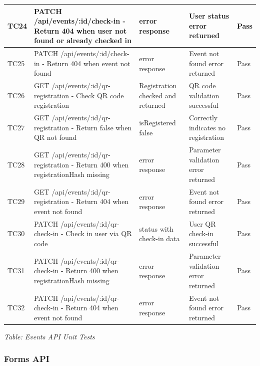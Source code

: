 \documentclass[12pt, titlepage]{article}
\begin{document}
\begin{longtable}{|>{\raggedright\arraybackslash}p{1cm}|>{\raggedright\arraybackslash}p{5cm}|>{\raggedright\arraybackslash}p{3.25cm}|>{\raggedright\arraybackslash}p{3.25cm}|>{\raggedright\arraybackslash}p{1.5cm}|}
\hline
TC24 & PATCH /api/events/:id/check-in - Return 404 when user not found or already checked in & 404 error response & User status error returned & \cellcolor{green!30}Pass \\
\hline
TC25 & PATCH /api/events/:id/check-in - Return 404 when event not found & 404 error response & Event not found error returned & \cellcolor{green!30}Pass \\
\hline
TC26 & GET /api/events/:id/qr-registration - Check QR code registration & Registration checked and returned & QR code validation successful & \cellcolor{green!30}Pass \\
\hline
TC27 & GET /api/events/:id/qr-registration - Return false when QR not found & isRegistered false & Correctly indicates no registration & \cellcolor{green!30}Pass \\
\hline
TC28 & GET /api/events/:id/qr-registration - Return 400 when registrationHash missing & 400 error response & Parameter validation error returned & \cellcolor{green!30}Pass \\
\hline
TC29 & GET /api/events/:id/qr-registration - Return 404 when event not found & 404 error response & Event not found error returned & \cellcolor{green!30}Pass \\
\hline
TC30 & PATCH /api/events/:id/qr-check-in - Check in user via QR code & 200 status with check-in data & User QR check-in successful & \cellcolor{green!30}Pass \\
\hline
TC31 & PATCH /api/events/:id/qr-check-in - Return 400 when registrationHash missing & 400 error response & Parameter validation error returned & \cellcolor{green!30}Pass \\
\hline
TC32 & PATCH /api/events/:id/qr-check-in - Return 404 when event not found & 404 error response & Event not found error returned & \cellcolor{green!30}Pass \\
\hline
\end{longtable}

\vspace{0.5cm}

{\small \textit{Table: Events API Unit Tests}}

\subsubsection{Forms API}
\end{document}
